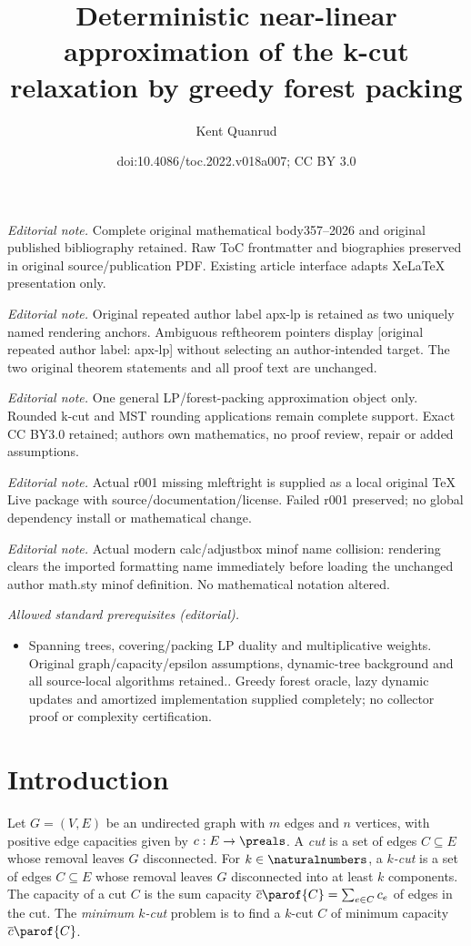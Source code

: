 \documentclass[11pt]{article}
\title{Deterministic near-linear approximation of the k-cut relaxation by greedy forest packing}
\author{Kent Quanrud}
\date{doi:10.4086/toc.2022.v018a007; CC BY 3.0}
\numberwithin{equation}{section}
\theoremstyle{definition}
\theoremstyle{plain}
\newcommand{\costof}[1]{c_{#1}}
\providecommand{\sumcost}{\overline{c}\parof} %
\begin{document}
\maketitle
\noindent\textit{Editorial note.} Complete original mathematical body357--2026 and original published bibliography retained. Raw ToC frontmatter and biographies preserved in original source/publication PDF. Existing article interface adapts XeLaTeX presentation only.\par\medskip
\noindent\textit{Editorial note.} Original repeated author label apx-lp is retained as two uniquely named rendering anchors. Ambiguous reftheorem pointers display [original repeated author label: apx-lp] without selecting an author-intended target. The two original theorem statements and all proof text are unchanged.\par\medskip
\noindent\textit{Editorial note.} One general LP/forest-packing approximation object only. Rounded k-cut and MST rounding applications remain complete support. Exact CC BY3.0 retained; authors own mathematics, no proof review, repair or added assumptions.\par\medskip
\noindent\textit{Editorial note.} Actual r001 missing mleftright is supplied as a local original TeX Live package with source/documentation/license. Failed r001 preserved; no global dependency install or mathematical change.\par\medskip
\noindent\textit{Editorial note.} Actual modern calc/adjustbox minof name collision: rendering clears the imported formatting name immediately before loading the unchanged author math.sty minof definition. No mathematical notation altered.\par\medskip
\noindent\textit{Allowed standard prerequisites (editorial).}\begin{itemize}
\item Spanning trees, covering/packing LP duality and multiplicative weights. Original graph/capacity/epsilon assumptions, dynamic-tree background and all source-local algorithms retained.. Greedy forest oracle, lazy dynamic updates and amortized implementation supplied completely; no collector proof or complexity certification.
\end{itemize}\medskip
\section{Introduction}

Let $G = (V,E)$ be an undirected graph with $m$ edges and $n$
vertices, with positive edge capacities given by $c : E \to
\preals$. A \emph{cut} is a set of edges $C \subseteq E$ whose removal
leaves $G$ disconnected. For $k \in \naturalnumbers$, a \emph{$k$-cut}
is a set of edges $C \subseteq E$ whose removal leaves $G$
disconnected into at least $k$ components. The capacity of a cut $C$
is the sum capacity $\sumcost{C} = \sum_{e \in C} \costof{e}$ of edges
in the cut. The \emph{minimum $k$-cut} problem is to find a $k$-cut
$C$ of minimum capacity $\sumcost{C}$.
\end{document}
